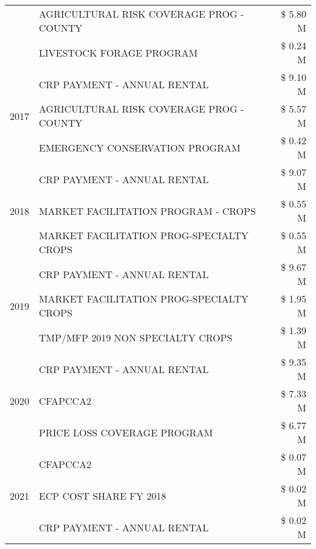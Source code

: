 \begin{tabular}{llr}
 & AGRICULTURAL RISK COVERAGE PROG - COUNTY & \$ 5.80 M \\
 & LIVESTOCK FORAGE PROGRAM & \$ 0.24 M \\
\cline{1-3}
\multirow[t]{3}{*}{2017} & CRP PAYMENT - ANNUAL RENTAL & \$ 9.10 M \\
 & AGRICULTURAL RISK COVERAGE PROG - COUNTY & \$ 5.57 M \\
 & EMERGENCY CONSERVATION PROGRAM & \$ 0.42 M \\
\cline{1-3}
\multirow[t]{3}{*}{2018} & CRP PAYMENT - ANNUAL RENTAL & \$ 9.07 M \\
 & MARKET FACILITATION PROGRAM - CROPS & \$ 0.55 M \\
 & MARKET FACILITATION PROG-SPECIALTY CROPS & \$ 0.55 M \\
\cline{1-3}
\multirow[t]{3}{*}{2019} & CRP PAYMENT - ANNUAL RENTAL & \$ 9.67 M \\
 & MARKET FACILITATION PROG-SPECIALTY CROPS & \$ 1.95 M \\
 & TMP/MFP 2019 NON SPECIALTY CROPS & \$ 1.39 M \\
\cline{1-3}
\multirow[t]{3}{*}{2020} & CRP PAYMENT - ANNUAL RENTAL & \$ 9.35 M \\
 & CFAPCCA2 & \$ 7.33 M \\
 & PRICE LOSS COVERAGE PROGRAM & \$ 6.77 M \\
\cline{1-3}
\multirow[t]{3}{*}{2021} & CFAPCCA2 & \$ 0.07 M \\
 & ECP COST SHARE FY 2018 & \$ 0.02 M \\
 & CRP PAYMENT - ANNUAL RENTAL & \$ 0.02 M \\
\cline{1-3}
\bottomrule
\end{tabular}
